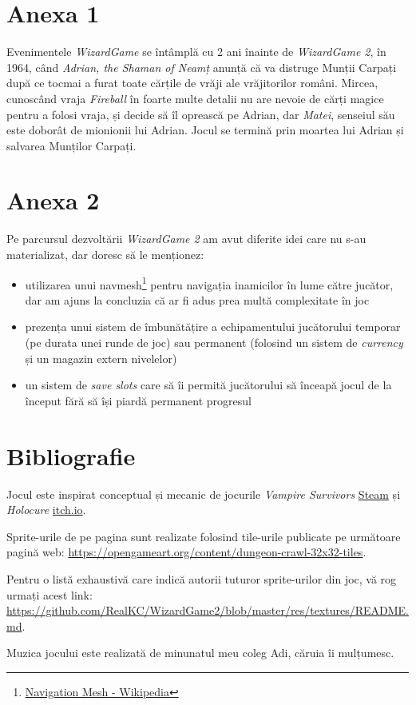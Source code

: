 \documentclass{article}
\begin{document}
    \section*{Anexa 1}
    \label{sec:anexa1}
    Evenimentele \emph{WizardGame} se întâmplă cu 2 ani înainte de \emph{WizardGame 2}, în 1964,
    când \emph{Adrian, the Shaman of Neamț} anunță că va distruge Munții Carpați după ce tocmai
    a furat toate cărțile de vrăji ale vrăjitorilor români. Mircea, cunoscând vraja \emph{Fireball}
    în foarte multe detalii nu are nevoie de cărți magice pentru a folosi vraja, și decide să îl
    oprească pe Adrian, dar \emph{Matei}, senseiul său este doborât de mionionii lui Adrian.
    Jocul se termină prin moartea lui Adrian și salvarea Munților Carpați.

    \section*{Anexa 2}
    Pe parcursul dezvoltării \emph{WizardGame 2} am avut diferite idei care nu s-au materializat,
    dar doresc să le menționez:
    \begin{itemize}
        \item utilizarea unui navmesh\footnote{\href{https://en.wikipedia.org/wiki/Navigation_mesh}{Navigation Mesh - Wikipedia}}
        pentru navigația inamicilor în lume către jucător, dar am ajuns la concluzia că ar fi adus
        prea multă complexitate în joc
        \item prezența unui sistem de îmbunătățire a echipamentului jucătorului temporar (pe durata
        unei runde de joc) sau permanent (folosind un sistem de \emph{currency} și un magazin extern
        nivelelor)
        \item un sistem de \emph{save slots} care să îi permită jucătorului să înceapă jocul de la
        început fără să își piardă permanent progresul
    \end{itemize}

    \section*{Bibliografie}
    Jocul este inspirat conceptual și mecanic de jocurile \emph{Vampire Survivors}
    \href{https://store.steampowered.com/app/1794680/Vampire_Survivors/}{Steam} și
    \emph{Holocure} \href{https://kay-yu.itch.io/holocure}{itch.io}.

    Sprite-urile de pe pagina \pageref{sec:sprites} sunt realizate folosind tile-urile publicate
    pe următoare pagină web: \url{https://opengameart.org/content/dungeon-crawl-32x32-tiles}.

    Pentru o listă exhaustivă care indică autorii tuturor sprite-urilor din joc, vă rog urmați
    acest link: \url{https://github.com/RealKC/WizardGame2/blob/master/res/textures/README.md}.

    Muzica jocului este realizată de minunatul meu coleg Adi, căruia îi mulțumesc.
\end{document}
